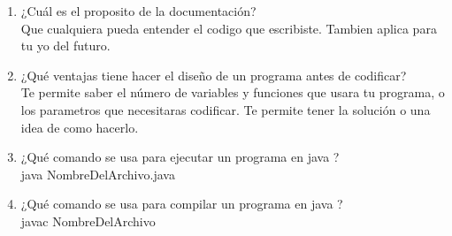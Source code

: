 \documentclass{article}
\begin{document}
\begin{enumerate}
\item ¿Cuál es el proposito de la documentación? \\
Que cualquiera pueda entender el codigo que escribiste. Tambien aplica para tu yo del futuro.\\
\item ¿Qué ventajas tiene hacer el diseño de un programa antes de codificar? \\
Te permite saber el número de variables y funciones que usara tu programa, o los parametros que necesitaras codificar. Te permite tener la solución o una idea de como hacerlo. \\
\item ¿Qué comando se usa para ejecutar un programa en java ? \\
java NombreDelArchivo.java  \\
\item ¿Qué comando se usa para compilar un programa en java ? \\
javac NombreDelArchivo \\

\end{enumerate}	
\end{document}
